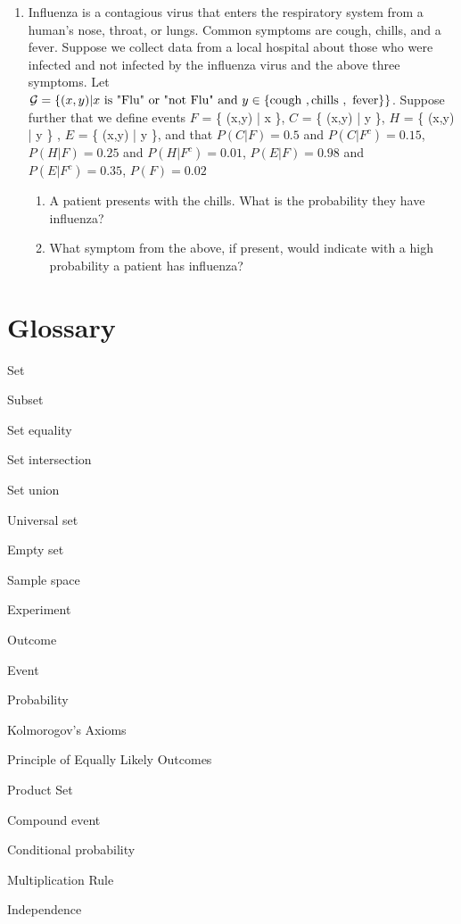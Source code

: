 \begin{enumerate}
   \item Influenza is a contagious virus that enters the respiratory system from a human's nose, throat, or lungs. Common symptoms are cough, chills, and a fever.
   Suppose we collect data from a local hospital about those who were infected and not infected by the influenza virus and the above three symptoms. Let $\mathcal{G} = \{ (x,y)  | x \text{ is } \text{"Flu"} \text{ or } \text{"not Flu"} \text{ and } y \in \{ \text{cough },\text{chills },\text{ fever} \}   \}$. 
   Suppose further that we define events $F$ = \{ (x,y)  | x   \}, $C$ = \{ (x,y)  | y   \}, $H$ = \{ (x,y)  | y   \} , $E$ = \{ (x,y)  | y   \}, and that $P( C|F ) = 0.5$ and $P( C|F^{c} ) = 0.15$, $P( H|F ) = 0.25$ and $P( H|F^{c} ) = 0.01$, $P( E|F ) = 0.98$ and $P( E|F^{c} ) = 0.35$, $P(F) = 0.02$  
    \begin{enumerate}
       \item A patient presents with the chills. What is the probability they have influenza? 
       \item What symptom from the above, if present, would indicate with a high probability a patient has influenza?
    \end{enumerate}
    
\end{enumerate}

\section{Glossary}
\begin{Glossary}
\item[Set]
\item[Subset]
\item[Set equality]
\item[Set intersection]
\item[Set union]
\item[Universal set]
\item[Empty set]
\item[Sample space]
\item[Experiment]
\item[Outcome]
\item[Event]
\item[Probability]
\item[Kolmorogov's Axioms]
\item[Principle of Equally Likely Outcomes]
\item[Product Set]
\item[Compound event]
\item[Conditional probability]
\item[Multiplication Rule]
\item[Independence]


\end{Glossary}



